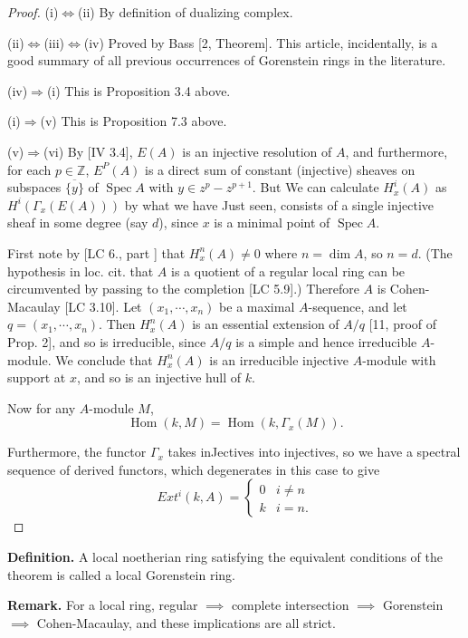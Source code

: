 \documentclass[12pt]{book}
\DeclareMathOperator{\Hom}{Hom}
\DeclareMathOperator{\Spec}{Spec}
\begin{document}
\setcounter{page}{294}
\begin{proof}
(i)\(\iff\)(ii) By definition of dualizing complex.

(ii)\(\iff\)(iii)\(\iff\)(iv) Proved by Bass [2, Theorem].
This article, incidentally, is a good summary of all previous occurrences of Gorenstein rings in the literature.

(iv)\(\Rightarrow\)(i) This is Proposition 3.4 above.

(i)\(\Rightarrow\)(v) This is Proposition 7.3 above.

(v)\(\Rightarrow\)(vi) By [IV 3.4], \(E(A)\) is an injective
resolution of \(A\), and furthermore, for each \(p \in \mathbb{Z}\), \(E^{P}(A)\) is a direct sum of constant (injective) sheaves on subspaces
\(\overline{\{y\}}\) of \(\Spec A\) with \(y \in z^{p}-z^{p+1}\).
But We can calculate \(H_{x}^{i}(A)\) as \(H^{i}(\Gamma_{x}(E(A)))\)
by what we have Just seen, consists of a single injective sheaf in some degree (say \(d\)), since \(x\) is a minimal point of \(\Spec A\).

\setcounter{page}{295}
First note by [LC 6., part ] that \(H_{x}^{n}(A) \neq0\) where \(n=\dim A\), so \(n=d\).
(The hypothesis in loc. cit. that \(A\) is a quotient of a regular local ring can be circumvented by passing to the completion [LC 5.9].)
Therefore \(A\) is Cohen-Macaulay [LC 3.10].
Let \((x_{1}, \cdots, x_{n})\) be a maximal \(A\)-sequence, and let \(q=(x_{1}, \cdots, x_{n})\).
Then \(H_{x}^{n}(A)\) is an essential extension of \(A/q\) [11, proof of Prop. 2], and so is irreducible, since \(A/q\) is a simple and hence irreducible \(A\)-module.
We conclude that \(H_{x}^{n}(A)\) is an irreducible injective \(A\)-module with support at \(x\), and so is an injective hull of \(k\).

Now for any \(A\)-module \(M\),
\[\Hom (k, M)=\Hom\left(k, \Gamma_{x}(M)\right).\]

Furthermore, the functor \(\Gamma_{x}\) takes inJectives into injectives, so we have a spectral sequence of derived functors, which degenerates in this case to give
\[Ext^{i}(k, A)=
\begin{cases}
0 & i \neq n \\
k & i=n .
\end{cases}\]
\end{proof}

\textbf{Definition.}
A local noetherian ring satisfying the equivalent conditions of the theorem is called a local Gorenstein ring.

\textbf{Remark.}
For a local ring, regular \(\implies\) complete intersection \(\implies\) Gorenstein \(\implies\) Cohen-Macaulay, and these implications are all strict.
\end{document}
